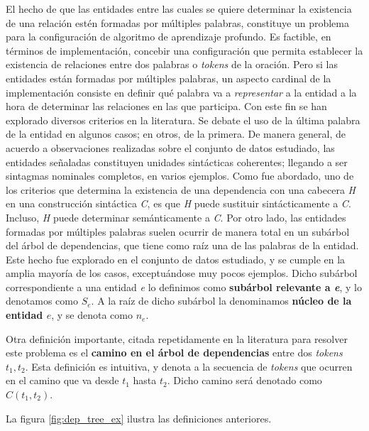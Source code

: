 El hecho de que las entidades entre las cuales se quiere determinar la existencia de una relación estén formadas por múltiples palabras, constituye un problema para la configuración de algoritmo de aprendizaje profundo.
Es factible, en términos de implementación, concebir una configuración que permita establecer la existencia de relaciones entre dos palabras o \textit{tokens} de la oración.
Pero si las entidades están formadas por múltiples palabras, un aspecto cardinal de la implementación consiste en definir qué palabra va a \textit{representar} a la entidad a la hora de determinar las relaciones en las que participa.
Con este fin se han explorado diversos criterios en la literatura.
Se debate el uso de la última palabra de la entidad en algunos casos; en otros, de la primera.
De manera general, de acuerdo a observaciones realizadas sobre el conjunto de datos estudiado, las entidades señaladas constituyen unidades sintácticas coherentes; llegando a ser sintagmas nominales completos, en varios ejemplos.
Como fue abordado, uno de los criterios que determina la existencia de una dependencia con una cabecera \textit{H} en una construcción sintáctica \textit{C}, es que \textit{H} puede sustituir sintácticamente a \textit{C}.
Incluso, \textit{H} puede determinar semánticamente a \textit{C}.
Por otro lado, las entidades formadas por múltiples palabras suelen ocurrir de manera total en un subárbol del árbol de dependencias, que tiene como raíz una de las palabras de la entidad.
Este hecho fue explorado en el conjunto de datos estudiado, y se cumple en la amplia mayoría de los casos, exceptuándose muy pocos ejemplos.
Dicho subárbol correspondiente a una entidad \textit{e} lo definimos como \textbf{subárbol relevante a \textit{e}}, y lo denotamos como $S_e$.
A la raíz de dicho subárbol la denominamos \textbf{núcleo de la entidad $e$}, y se denota como $n_e$.

Otra definición importante, citada repetidamente en la literatura para resolver este problema es el \textbf{camino en el árbol de dependencias} entre dos \textit{tokens} $t_1,t_2$.
Esta definición es intuitiva, y denota a la secuencia de \textit{tokens} que ocurren en el camino que va desde $t_1$ hasta $t_2$.
Dicho camino será denotado como $C(t_1,t_2)$.

La figura \ref{fig:dep_tree_ex} ilustra las definiciones anteriores.


